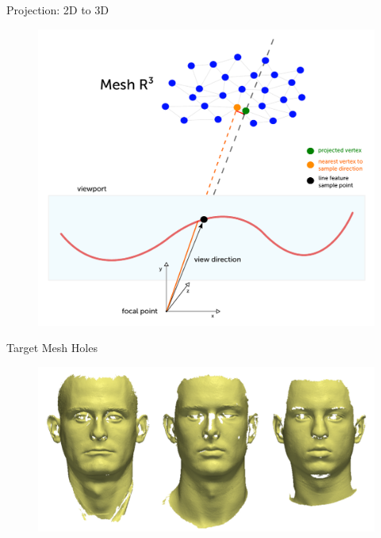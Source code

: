 \documentclass[xcolor=x11names,compress]{beamer}
\begin{document}
    \begin{frame}{Projection: 2D to 3D}
        \begin{figure}
            \centering
            \includegraphics[width=.8\textwidth]{../resources/figures/projection.pdf}
        \end{figure}
    \end{frame}

    \begin{frame}{Target Mesh Holes}
        \begin{figure}
            \centering
            \includegraphics[width=.8\textwidth]{../resources/img/holes.pdf}
        \end{figure}
    \end{frame}
\end{document}

